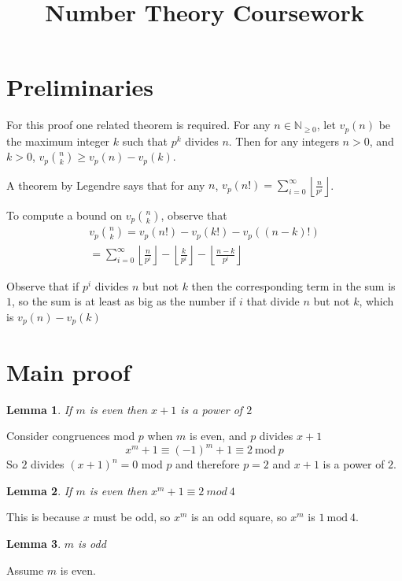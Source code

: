 \documentclass[11pt]{article} %
\title{Number Theory Coursework}
\date{}
\newtheorem{lemma}{Lemma}
\begin{document}
\maketitle

\section{Preliminaries}

For this proof one related theorem is required. For any $n \in \mathbb{N}_{\ge0}$, let
$v_p(n)$ be the maximum integer $k$ such that $p^k$ divides $n$. Then for any integers $n > 0$, and $k > 0$,
$v_p{{n}\choose{k}} \ge v_p(n) - v_p(k)$.

A theorem by Legendre says that for any $n$, $v_p(n!) = \sum_{i=0}^{\infty} \left\lfloor\frac{n}{p^i}\right\rfloor $.

To compute a bound on $v_p{{n}\choose{k}}$, observe that
\begin{equation}
  \begin{aligned}
    v_p{{n}\choose{k}} = v_p(n!) - v_p(k!) - v_p ((n-k)!) \\
    = \sum_{i=0}^{\infty} \left\lfloor\frac{n}{p^i}\right\rfloor - \left\lfloor\frac{k}{p^i}\right\rfloor
      - \left\lfloor\frac{n-k}{p^i}\right\rfloor
  \end{aligned}
\end{equation}

Observe that if $p^i$ divides $n$ but not $k$ then the corresponding term in the sum is $1$,
so the sum is at least as big as the number if $i$ that divide $n$ but not $k$, which is
$v_p(n) - v_p(k)$

\section{Main proof}
\begin{lemma}\label{lem:even2}
  If $m$ is even then $x+1$ is a power of $2$
\end{lemma}
Consider congruences mod $p$ when $m$ is even, and $p$ divides $x+1$
\begin{equation}
  x^m + 1 \equiv (-1)^m + 1 \equiv 2 \ \text{mod} \ p
\end{equation}
So $2$ divides $(x+1)^n = 0$ mod $p$ and therefore $p = 2$ and $x + 1$ is a power of $2$.
\begin{lemma}\label{lem:2mod4}
  If $m$ is even then $x^m + 1 \equiv 2 \ mod \ 4$
\end{lemma}
  This is because $x$ must be odd, so $x^m$ is an odd square, so $x^m$ is $1 \ \text{mod} \ 4$.
\begin{lemma}
  $m$ is odd
\end{lemma}
Assume $m$ is even.
\end{document}
